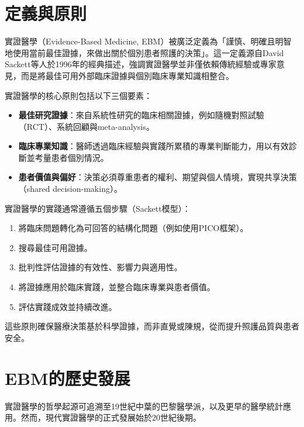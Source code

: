 
\section{定義與原則}

實證醫學（Evidence-Based Medicine, EBM）被廣泛定義為「謹慎、明確且明智地使用當前最佳證據，來做出關於個別患者照護的決策」。這一定義源自David Sackett等人於1996年的經典描述，強調實證醫學並非僅依賴傳統經驗或專家意見，而是將最佳可用外部臨床證據與個別臨床專業知識相整合。

實證醫學的核心原則包括以下三個要素：
\begin{itemize}
    \item \textbf{最佳研究證據}：來自系統性研究的臨床相關證據，例如隨機對照試驗（RCT）、系統回顧與meta-analysis。
    \item \textbf{臨床專業知識}：醫師透過臨床經驗與實踐所累積的專業判斷能力，用以有效診斷並考量患者個別情況。
    \item \textbf{患者價值與偏好}：決策必須尊重患者的權利、期望與個人情境，實現共享決策（shared decision-making）。
\end{itemize}

實證醫學的實踐通常遵循五個步驟（Sackett模型）：
\begin{enumerate}
    \item 將臨床問題轉化為可回答的結構化問題（例如使用PICO框架）。
    \item 搜尋最佳可用證據。
    \item 批判性評估證據的有效性、影響力與適用性。
    \item 將證據應用於臨床實踐，並整合臨床專業與患者價值。
    \item 評估實踐成效並持續改進。
\end{enumerate}

這些原則確保醫療決策基於科學證據，而非直覺或陳規，從而提升照護品質與患者安全。

\section{EBM的歷史發展}

實證醫學的哲學起源可追溯至19世紀中葉的巴黎醫學派，以及更早的醫學統計應用。然而，現代實證醫學的正式發展始於20世紀後期。

